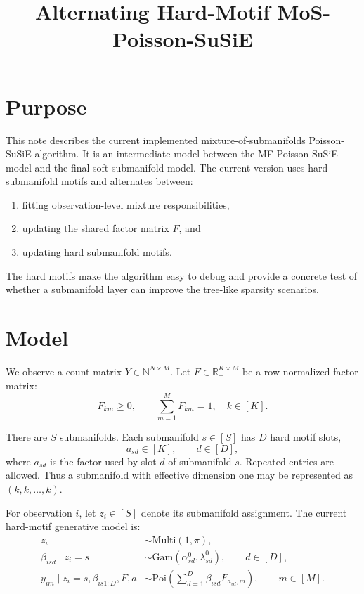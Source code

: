 \documentclass[11pt]{article}
\title{Alternating Hard-Motif MoS-Poisson-SuSiE}
\author{}
\date{}
\newcommand{\Gam}{\mathrm{Gam}}
\newcommand{\Poi}{\mathrm{Poi}}
\newcommand{\Multi}{\mathrm{Multi}}
\theoremstyle{definition}
\begin{document}
\maketitle

\section{Purpose}

This note describes the current implemented mixture-of-submanifolds
Poisson-SuSiE algorithm. It is an intermediate model between the
MF-Poisson-SuSiE model and the final soft submanifold model. The current version
uses hard submanifold motifs and alternates between:
\begin{enumerate}
  \item fitting observation-level mixture responsibilities,
  \item updating the shared factor matrix $F$, and
  \item updating hard submanifold motifs.
\end{enumerate}

The hard motifs make the algorithm easy to debug and provide a concrete test of
whether a submanifold layer can improve the tree-like sparsity scenarios.

\section{Model}

We observe a count matrix $Y \in \mathbb{N}^{N \times M}$. Let
$F \in \mathbb{R}_+^{K \times M}$ be a row-normalized factor matrix:
\[
  F_{km} \geq 0, \qquad \sum_{m=1}^{M} F_{km} = 1, \quad k \in [K].
\]

There are $S$ submanifolds. Each submanifold $s \in [S]$ has $D$ hard motif
slots,
\[
  a_{sd} \in [K], \qquad d \in [D],
\]
where $a_{sd}$ is the factor used by slot $d$ of submanifold $s$. Repeated
entries are allowed. Thus a submanifold with effective dimension one may be
represented as $(k,k,\ldots,k)$.

For observation $i$, let $z_i \in [S]$ denote its submanifold assignment. The
current hard-motif generative model is:
\begin{align}
  z_i &\sim \Multi(1,\pi), \\
  \beta_{isd} \mid z_i=s &\sim \Gam(\alpha^0_{sd}, \lambda^0_{sd}),
    \qquad d \in [D], \\
  y_{im} \mid z_i=s, \beta_{is1:D}, F, a
    &\sim \Poi\left(\sum_{d=1}^{D} \beta_{isd} F_{a_{sd},m}\right),
    \qquad m \in [M].
\end{align}
\end{document}
